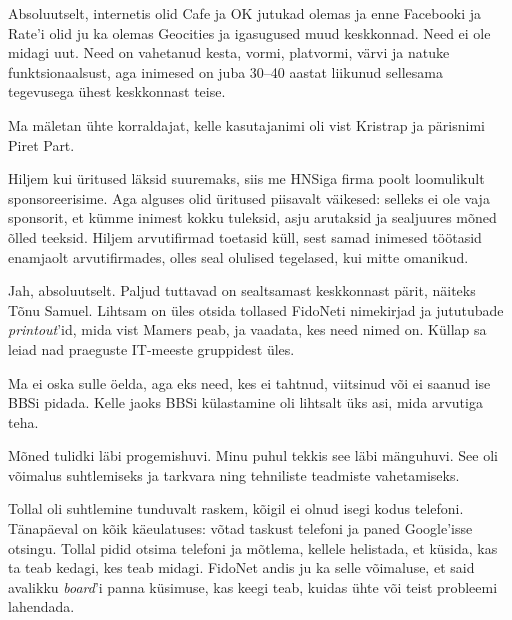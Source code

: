 Absoluutselt, internetis olid Cafe ja OK jutukad olemas ja enne 
Facebooki ja Rate'i olid ju ka olemas Geocities ja igasugused muud keskkonnad. Need ei ole midagi uut. Need on vahetanud kesta, vormi, 
platvormi, värvi ja natuke funktsionaalsust, aga inimesed on juba 30--40 
aastat liikunud sellesama tegevusega ühest keskkonnast teise.


Ma mäletan ühte korraldajat, kelle kasutajanimi oli vist Kristrap ja pärisnimi Piret 
Part.


Hiljem kui üritused läksid suuremaks, siis me HNSiga firma poolt loomulikult 
sponsoreerisime. Aga alguses olid üritused piisavalt väikesed: selleks ei ole vaja sponsorit, et kümme
inimest kokku tuleksid, asju arutaksid ja sealjuures mõned 
õlled teeksid. Hiljem arvutifirmad toetasid küll, sest samad inimesed 
töötasid enamjaolt arvutifirmades, olles seal olulised tegelased, kui mitte 
omanikud.


Jah, absoluutselt. Paljud tuttavad on sealtsamast keskkonnast pärit, näiteks Tõnu 
Samuel. Lihtsam on üles otsida tollased FidoNeti nimekirjad ja jututubade 
\emph{printout}'id, mida vist Mamers peab, ja vaadata, 
kes need nimed on. Küllap sa leiad nad praeguste 
IT-meeste gruppidest üles.


Ma ei oska sulle öelda, aga eks need, kes ei 
tahtnud, viitsinud või ei saanud ise BBSi pidada. Kelle jaoks BBSi külastamine oli 
lihtsalt üks asi, mida arvutiga teha.


Mõned tulidki läbi progemishuvi. Minu puhul tekkis see läbi mänguhuvi. See oli võimalus suhtlemiseks ja tarkvara ning tehniliste teadmiste vahetamiseks.

Tollal oli suhtlemine tunduvalt raskem, kõigil ei olnud 
isegi kodus telefoni. Tänapäeval on kõik käeulatuses: võtad
taskust telefoni ja paned Google'isse otsingu. Tollal 
pidid otsima telefoni ja mõtlema, kellele helistada, et küsida, kas ta teab 
kedagi, kes teab midagi. FidoNet andis ju ka selle võimaluse, et said 
avalikku \emph{board}'i panna küsimuse, kas keegi teab, kuidas 
ühte või teist probleemi lahendada.

